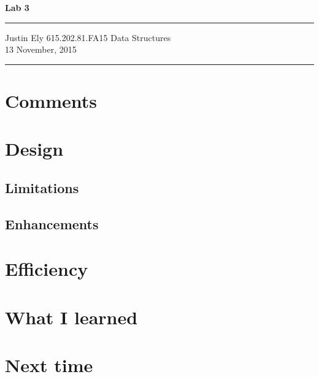 \documentclass[a4paper,12pt]{article}
\begin{document}
\begin{flushright}

\vspace{1.1cm}

{\bf\Huge Lab 3}

\rule{0.25\linewidth}{0.5pt}

\vspace{0.5cm}
Justin Ely
\linebreak
\newline
\footnotesize{615.202.81.FA15 Data Structures \\}
\vspace{0.5cm}
13 November, 2015
\end{flushright}

\noindent\rule{\linewidth}{1.0pt}


\section{Comments}



\section{Design}


\subsection{Limitations}

\subsection{Enhancements}



\section{Efficiency}



\section{What I learned}


\section{Next time}


\end{document}
